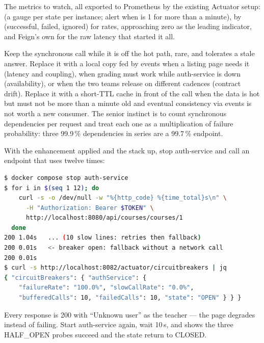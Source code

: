 The metrics to watch, all exported to Prometheus by the existing
Actuator setup:  (a gauge per
state per instance; alert when  is 1 for more than a
minute),  by
 (successful, failed, ignored) for rates,
 approaching
zero as the leading indicator, and Feign's own
 for the raw latency that started
it all.

\begin{decision}
Keep the synchronous call while it is off the hot path, rare, and
tolerates a stale answer. Replace it with a local copy fed by events
when a listing page needs it (latency and coupling), when grading must
work while auth-service is down (availability), or when the two teams
release on different cadences (contract drift). Replace it with a
short-TTL cache in front of the call when the data is hot but must not
be more than a minute old and eventual consistency via events is not
worth a new consumer. The senior instinct is to count synchronous
dependencies per request and treat each one as a multiplication of
failure probability: three 99.9\,\% dependencies in series are a
99.7\,\% endpoint.
\end{decision}

\begin{handson}
With the enhancement applied and the stack up, stop auth-service and
call an endpoint that uses  twelve times:
\begin{lstlisting}[language=bash]
$ docker compose stop auth-service
$ for i in $(seq 1 12); do
    curl -s -o /dev/null -w "%{http_code} %{time_total}s\n" \
      -H "Authorization: Bearer $TOKEN" \
      http://localhost:8080/api/courses/courses/1
  done
200 1.04s   ... (10 slow lines: retries then fallback)
200 0.01s   <- breaker open: fallback without a network call
200 0.01s
$ curl -s http://localhost:8082/actuator/circuitbreakers | jq
{ "circuitBreakers": { "authService": {
    "failureRate": "100.0%", "slowCallRate": "0.0%",
    "bufferedCalls": 10, "failedCalls": 10, "state": "OPEN" } } }
\end{lstlisting}
Every response is 200 with ``Unknown user'' as the teacher --- the page
degrades instead of failing. Start auth-service again, wait 10\,s, and
\code{/actuator/circuitbreakerevents} shows the three HALF\_OPEN probes
succeed and the state return to CLOSED.
\end{handson}

